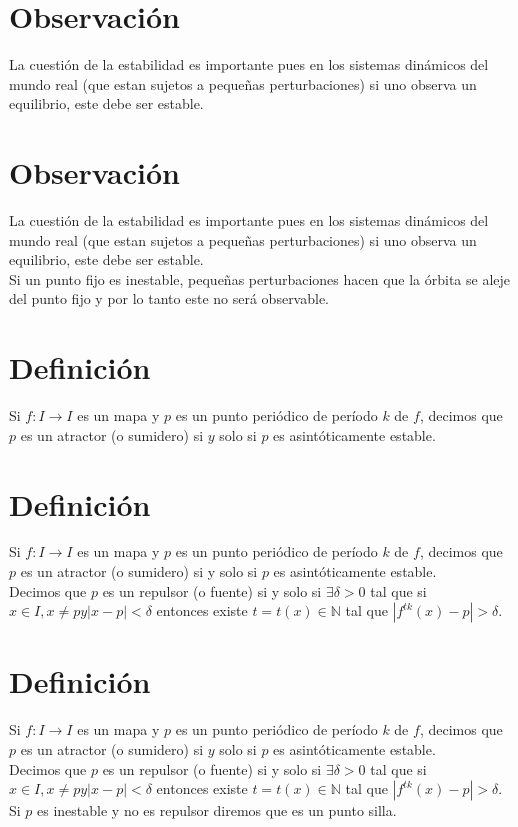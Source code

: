 \documentclass[11pt]{beamer}
\begin{document}
\section*{Observación}
La cuestión de la estabilidad es importante pues en los sistemas dinámicos del mundo real (que estan sujetos a pequeñas perturbaciones) si uno observa un equilibrio, este debe ser estable.

\section*{Observación}
La cuestión de la estabilidad es importante pues en los sistemas dinámicos del mundo real (que estan sujetos a pequeñas perturbaciones) si uno observa un equilibrio, este debe ser estable.\\
Si un punto fijo es inestable, pequeñas perturbaciones hacen que la órbita se aleje del punto fijo y por lo tanto este no será observable.

\section*{Definición}
Si $f: I \rightarrow I$ es un mapa y $p$ es un punto periódico de período $k$ de $f$, decimos que $p$ es un atractor (o sumidero) si $y$ solo si $p$ es asintóticamente estable.

\section*{Definición}
Si $f: I \rightarrow I$ es un mapa y $p$ es un punto periódico de período $k$ de $f$, decimos que $p$ es un atractor (o sumidero) si y solo si $p$ es asintóticamente estable.\\
Decimos que $p$ es un repulsor (o fuente) si y solo si $\exists \delta>0$ tal que si $x \in I, x \neq p y|x-p|<\delta$ entonces existe $t=t(x) \in \mathbb{N}$ tal que $\left|f^{t k}(x)-p\right|>\delta$.

\section*{Definición}
Si $f: I \rightarrow I$ es un mapa y $p$ es un punto periódico de período $k$ de $f$, decimos que $p$ es un atractor (o sumidero) si $y$ solo si $p$ es asintóticamente estable.\\
Decimos que $p$ es un repulsor (o fuente) si y solo si $\exists \delta>0$ tal que si $x \in I, x \neq p y|x-p|<\delta$ entonces existe $t=t(x) \in \mathbb{N}$ tal que $\left|f^{t k}(x)-p\right|>\delta$.\\
Si $p$ es inestable y no es repulsor diremos que es un punto silla.
\end{document}
